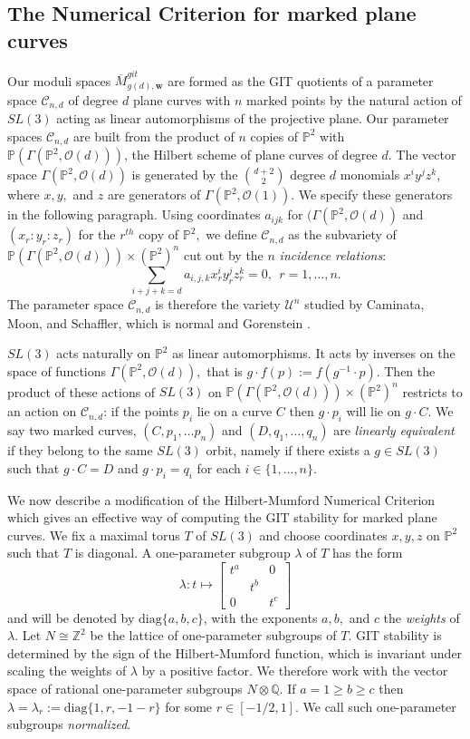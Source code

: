 \documentclass{amsart}
\newcommand{\Z}{\mathbb{Z}}
\newcommand{\Q}{\mathbb{Q}}
\newcommand{\Pj}{\mathbb{P}}
\newcommand{\mc}{\mathcal}
\newcommand{\diag}{\text{diag}}
\numberwithin{equation}{section}
\theoremstyle{definition}
\begin{document}
\subsection{The Numerical Criterion for marked plane curves}
Our moduli spaces $\overline{M}^{git}_{g(d), \mathbf{w}}$ are formed as the GIT quotients of a parameter space $\mc{C}_{n,d}$ of degree $d$ plane curves with $n$ marked points by the natural action of $SL(3)$ acting as linear automorphisms of the projective plane. Our parameter spaces $\mc{C}_{n,d}$ are built from the product of  $n$ copies of $\Pj^2$ with $\Pj(\Gamma(\Pj^2, \mc{O}(d)))$, the Hilbert scheme of plane curves of degree $d$. The vector space $\Gamma(\Pj^2, \mc{O}(d))$ is generated by the $\binom{d+2}{2}$ degree $d$ monomials $x^iy^jz^k$, where $x,y,$ and $z$ are generators of $\Gamma(\Pj^2, \mc{O}(1))$. We specify these generators in the following paragraph. Using coordinates $a_{ijk}$ for $(\Gamma(\Pj^2, \mc{O}(d))$ and $(x_r:y_r:z_r)$ for the $r^{th}$ copy of $\Pj^2,$ we define $\mc{C}_{n,d}$ as the subvariety of $\Pj(\Gamma(\Pj^2, \mc{O}(d))) \times (\Pj^2)^n$ cut out by the $n$ \textit{incidence relations}: $$\sum_{i+j+k=d} a_{i,j,k}x_r^iy_r^jz_r^k = 0, \ \ r = 1, \dots , n.$$
The parameter space $\mc{C}_{n,d}$ is therefore the variety $\mc{U}^n$ studied by Caminata, Moon, and Schaffler, which is normal and Gorenstein \cite[Remark 4.14]{CamMoonSchaff}.

$SL(3)$ acts naturally on $\Pj^2$ as linear automorphisms. It acts by inverses on the space of functions $\Gamma(\Pj^2, \mc{O}(d)),$ that is $g \cdot f(p) := f(g^{-1} \cdot p)$. Then the product of these actions of $SL(3)$ on $\Pj(\Gamma(\Pj^2, \mc{O}(d))) \times (\Pj^2)^n$ restricts to an action on $\mc{C}_{n,d}$: if the points $p_i$ lie on a curve $C$ then $g \cdot p_i$ will lie on $g \cdot C.$ We say two marked curves, $(C, p_1, \dots p_n)$ and $(D, q_1, \dots , q_n)$ are \textit{linearly equivalent} if they belong to the same $SL(3)$ orbit, namely if there exists a $g \in SL(3)$ such that $g \cdot C=D$ and $g \cdot p_i=q_i$ for each $i \in \{1, \dots , n\}.$

We now describe a modification of the Hilbert-Mumford Numerical Criterion which gives an effective way of computing the GIT stability for marked plane curves. We fix a maximal torus $T$ of $SL(3)$ and choose coordinates $x, y, z$ on $\Pj^2$ such that $T$ is diagonal. A one-parameter subgroup $\lambda$ of $T$ has the form
$$\lambda: t \mapsto \begin{bmatrix}
    t^a & & 0 \\
    & t^b & \\
    0 & & t^c
\end{bmatrix}$$
and will be denoted by $\diag\{a,b,c\}$, with the exponents $a,b,$ and $c$ the \textit{weights} of $\lambda$. Let $N \cong \Z^2$ be the lattice of one-parameter subgroups of $T$. GIT stability is determined by the sign of the Hilbert-Mumford function, which is invariant under scaling the weights of $\lambda$ by a positive factor. We therefore work with the vector space of rational one-parameter subgroups $N \otimes \Q$. If $a=1 \geq b \geq c$ then $\lambda = \lambda_r := \diag\{1,r,-1-r\}$ for some $r \in [-1/2, 1]$. We call such one-parameter subgroups \textit{normalized}.
\end{document}
